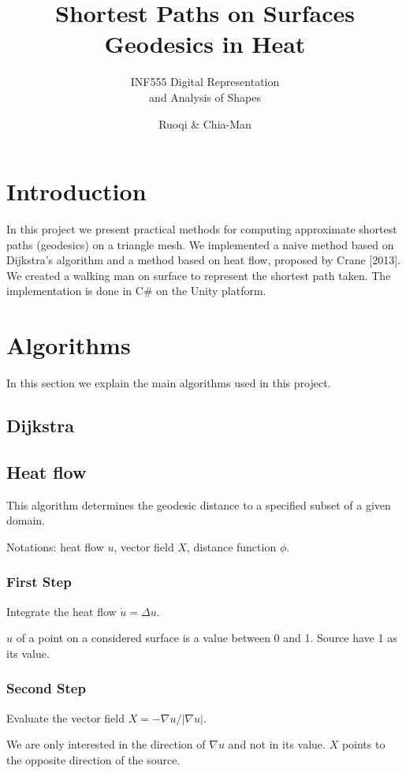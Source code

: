 \documentclass[a4paper,12pt,twoside]{article}
\title{Shortest Paths on Surfaces\\ Geodesics in Heat}
\subtitle{INF555 Digital Representation\\ and Analysis of Shapes }
\author{Ruoqi \bsc{He} \& Chia-Man \bsc{Hung}}
\begin{document}
\maketitle

\section{Introduction}

In this project we present practical methods for computing approximate shortest paths (geodesics) on a triangle mesh. We implemented a naive method based on Dijkstra's algorithm and a method based on heat flow, proposed by Crane [2013]. We created a walking man on surface to represent the shortest path taken. The implementation is done in C\# on the Unity platform.

\section{Algorithms}

In this section we explain the main algorithms used in this project.

\subsection{Dijkstra}

\subsection{Heat flow}
This algorithm determines the geodesic distance to a specified subset of a given domain. 

Notations: heat flow $u$, vector field $X$, distance function $\phi$.

\subsubsection{First Step}
Integrate the heat flow $\dot{u} = \Delta u$.

$u$ of a point on a considered surface is a value between 0 and 1. Source have 1 as its value.

\subsubsection{Second Step}
Evaluate the vector field $X = -\nabla u / \left | \nabla u \right |$.

We are only interested in the direction of $\nabla u$ and not in its value. $X$ points to the opposite direction of the source. 
\end{document}
